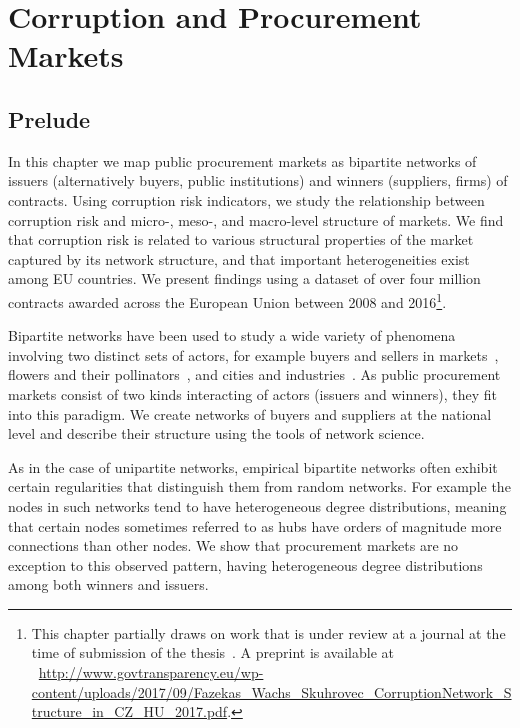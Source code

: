 \chapter{Corruption and Procurement Markets}

\section{Prelude}

In this chapter we map public procurement markets as bipartite networks of issuers (alternatively buyers, public institutions) and winners (suppliers, firms) of contracts. Using corruption risk indicators, we study the relationship between corruption risk and micro-, meso-, and macro-level structure of markets. We find that corruption risk is related to various structural properties of the market captured by its network structure, and that important heterogeneities exist among EU countries. We present findings using a dataset of over four million contracts awarded across the European Union between 2008 and 2016\footnote{This chapter partially draws on work that is under review at a journal at the time of submission of the thesis~\cite{fazekas2017corruption}. A preprint is available at ~\url{http://www.govtransparency.eu/wp-content/uploads/2017/09/Fazekas_Wachs_Skuhrovec_CorruptionNetwork_Structure_in_CZ_HU_2017.pdf}.}.

Bipartite networks have been used to study a wide variety of phenomena involving two distinct sets of actors, for example buyers and sellers in markets~\cite{hernandez2018trust}, flowers and their pollinators~\cite{jordano2003invariant}, and cities and industries~\cite{bustos2012dynamics}. As public procurement markets consist of two kinds interacting of actors (issuers and winners), they fit into this paradigm. We create networks of buyers and suppliers at the national level and describe their structure using the tools of network science.

As in the case of unipartite networks, empirical bipartite networks often exhibit certain regularities that distinguish them from random networks. For example the nodes in such networks tend to have heterogeneous degree distributions, meaning that certain nodes sometimes referred to as hubs have orders of magnitude more connections than other nodes. We show that procurement markets are no exception to this observed pattern, having heterogeneous degree distributions among both winners and issuers.

